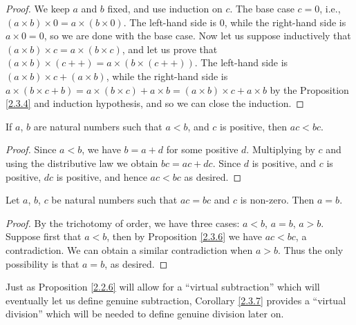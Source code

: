 \begin{proof}
We keep \(a\) and \(b\) fixed, and use induction on \(c\).
The base case \(c = 0\), i.e., \((a \times b) \times 0 = a \times (b \times 0)\).
The left-hand side is \(0\), while the right-hand side is \(a \times 0 = 0\), so we are done with the base case.
Now let us suppose inductively that \((a \times b) \times c = a \times (b \times c)\), and let us prove that \((a \times b) \times (c++) = a \times (b \times (c++))\).
The left-hand side is \((a \times b) \times c + (a \times b)\), while the right-hand side is \(a \times (b \times c + b) = a \times (b \times c) + a \times b = (a \times b) \times c + a \times b\) by the Proposition \ref{2.3.4} and induction hypothesis, and so we can close the induction.
\end{proof}

\begin{proposition}\label{2.3.6}
If \(a\), \(b\) are natural numbers such that \(a < b\), and \(c\) is positive, then \(ac < bc\).
\end{proposition}

\begin{proof}
Since \(a < b\), we have \(b = a + d\) for some positive \(d\).
Multiplying by \(c\) and using the distributive law we obtain \(bc = ac + dc\).
Since \(d\) is positive, and \(c\) is positive, \(dc\) is positive, and hence \(ac < bc\) as desired.
\end{proof}

\begin{corollary}\label{2.3.7}
Let \(a\), \(b\), \(c\) be natural numbers such that \(ac = bc\) and \(c\) is non-zero.
Then \(a = b\).
\end{corollary}

\begin{proof}
By the trichotomy of order, we have three cases: \(a < b\), \(a = b\), \(a > b\).
Suppose first that \(a < b\), then by Proposition \ref{2.3.6} we have \(ac < bc\), a contradiction.
We can obtain a similar contradiction when \(a > b\).
Thus the only possibility is that \(a = b\), as desired.
\end{proof}

\begin{remark}\label{2.3.8}
Just as Proposition \ref{2.2.6} will allow for a ``virtual subtraction'' which will eventually let us define genuine subtraction, Corollary \ref{2.3.7} provides a ``virtual division'' which will be needed to define genuine division later on.
\end{remark}

